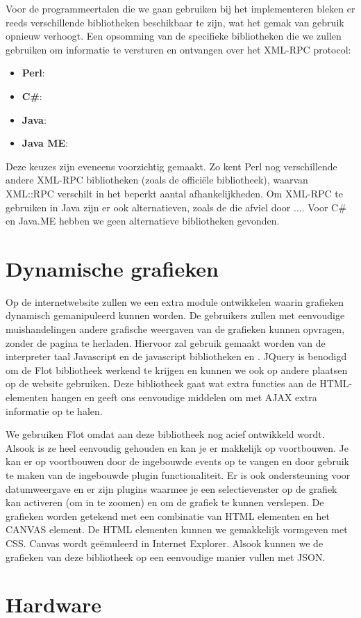 Voor de programmeertalen die we gaan gebruiken bij het implementeren bleken er reeds verschillende bibliotheken beschikbaar te zijn, wat het gemak van gebruik opnieuw verhoogt. Een opsomming van de specifieke bibliotheken die we zullen gebruiken om informatie te versturen en ontvangen over het XML-RPC protocol:
\begin{itemize}
\item{\textbf{Perl}: }
\item{\textbf{C\#}: }
\item{\textbf{Java}: }
\item{\textbf{Java ME}: }
\end{itemize}

Deze keuzes zijn eveneens voorzichtig gemaakt. Zo kent Perl nog verschillende andere XML-RPC bibliotheken (zoals de offici\"ele  bibliotheek), waarvan XML::RPC verschilt in het beperkt aantal afhankelijkheden. Om XML-RPC te gebruiken in Java zijn er ook alternatieven, zoals de  die afviel door .... Voor C\# en Java.ME hebben we geen alternatieve bibliotheken gevonden.

\section{Dynamische grafieken}

Op de internetwebsite zullen we een extra module ontwikkelen waarin grafieken dynamisch gemanipuleerd kunnen worden. De gebruikers zullen met eenvoudige muishandelingen andere grafische weergaven van de grafieken kunnen opvragen, zonder de pagina te herladen. Hiervoor zal gebruik gemaakt worden van de interpreter taal Javascript en de javascript bibliotheken  en . JQuery is benodigd om de Flot bibliotheek werkend te krijgen en kunnen we ook op andere plaatsen op de website gebruiken. Deze bibliotheek gaat wat extra functies aan de HTML-elementen hangen en geeft ons eenvoudige middelen om met AJAX extra informatie op te halen.

We gebruiken Flot omdat aan deze bibliotheek nog acief ontwikkeld wordt. Alsook is ze heel eenvoudig gehouden en kan je er makkelijk op voortbouwen. Je kan er op voortbouwen door de ingebouwde events op te vangen en door gebruik te maken van de ingebouwde plugin functionaliteit. Er is ook ondersteuning voor datumweergave en er zijn plugins waarmee je een selectievenster op de grafiek kan activeren (om in te zoomen) en om de grafiek te kunnen verslepen.
De grafieken worden getekend met een combinatie van HTML elementen en het CANVAS element. De HTML elementen kunnen we gemakkelijk vormgeven met CSS. Canvas wordt ge\"emuleerd in Internet Explorer. Alsook kunnen we de grafieken van deze bibliotheek op een eenvoudige manier vullen met JSON.

\section{Hardware}

